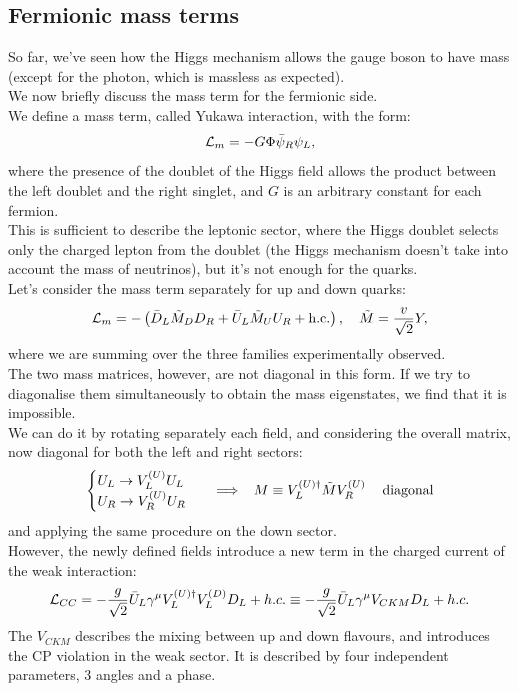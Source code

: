 \subsection{Fermionic mass terms}

So far, we've seen how the Higgs mechanism allows the gauge boson to have mass (except for the photon, which is massless as expected).\\
We now briefly discuss the mass term for the fermionic side.\\
We define a mass term, called Yukawa interaction, with the form:
\begin{equation}
    \mathcal{L}_m = - G \Phi \Bar{\psi}_R \psi_L,
\end{equation}
where the presence of the doublet of the Higgs field allows the product between the left doublet and the right singlet, and $G$ is an arbitrary constant for each fermion.\\
This is sufficient to describe the leptonic sector, where the Higgs doublet selects only the charged lepton from the doublet (the Higgs mechanism doesn't take into account the mass of neutrinos), but it's not enough for the quarks.\\
Let's consider the mass term separately for up and down quarks:
\begin{equation}
    \mathcal{L}_m = -\left(\Bar{D}_L \Tilde{M}_D D_R + \Bar{U}_L \Tilde{M}_U U_R + \text{h.c.} \right), \quad \Tilde{M}= \frac{v}{\sqrt{2}}Y,
\end{equation}
where we are summing over the three families experimentally observed.\\
The two mass matrices, however, are not diagonal in this form. If we try to diagonalise them simultaneously to obtain the mass eigenstates, we find that it is impossible.\\
We can do it by rotating separately each field, and considering the overall matrix, now diagonal for both the left and right sectors:
\begin{equation}
    \begin{cases}
        U_L \rightarrow V_L^{(U)} U_L\\
        U_R \rightarrow V_R^{(U)} U_R
    \end{cases}
    \hspace{8pt} \Longrightarrow \hspace{8pt}M \equiv V_L^{(U)\dagger}\Tilde{M}V_R^{(U)} \hspace{12pt} \text{diagonal}
\end{equation}
and applying the same procedure on the down sector.\\
However, the newly defined fields introduce a new term in the charged current of the weak interaction:
\begin{equation}
    \mathcal{L}_{CC} = - \frac{g}{\sqrt{2}}\Bar{U}_L\gamma^{\mu}V_L^{(U)\dagger}V_L^{(D)}D_L + h.c. \equiv - \frac{g}{\sqrt{2}}\Bar{U}_L\gamma^{\mu}V_{CKM}D_L + h.c.
\end{equation}
The $V_{CKM}$ describes the mixing between up and down flavours, and introduces the CP violation in the weak sector. It is described by four independent parameters, 3 angles and a phase.\\

